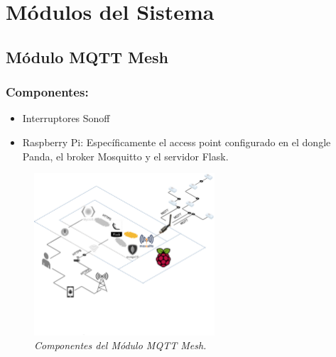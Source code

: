 \begin{itemize}

\end{itemize}


\section{Módulos del Sistema}

\subsection{Módulo MQTT Mesh}

\subsubsection{Componentes:}

\begin{itemize}

\item Interruptores Sonoff

\item Raspberry Pi: Específicamente el access point configurado en el dongle Panda, el broker Mosquitto y el servidor Flask.

\end{itemize}

\begin{figure}[h]
  \centering
  \includegraphics[width=0.6\textwidth, keepaspectratio]{images/mod-MQTT}
  \caption{\textit{Componentes del Módulo MQTT Mesh.}}
  \label{fig:mod-mqtt-comp}
\end{figure}

